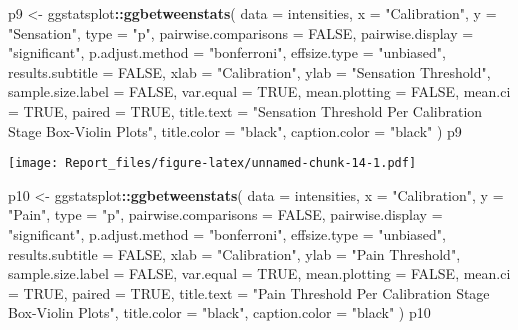 \documentclass[
]{article}
\newenvironment{Shaded}{\begin{snugshade}}{\end{snugshade}}
\newcommand{\DataTypeTok}[1]{\textcolor[rgb]{0.13,0.29,0.53}{#1}}
\newcommand{\KeywordTok}[1]{\textcolor[rgb]{0.13,0.29,0.53}{\textbf{#1}}}
\newcommand{\NormalTok}[1]{#1}
\newcommand{\OperatorTok}[1]{\textcolor[rgb]{0.81,0.36,0.00}{\textbf{#1}}}
\newcommand{\OtherTok}[1]{\textcolor[rgb]{0.56,0.35,0.01}{#1}}
\newcommand{\StringTok}[1]{\textcolor[rgb]{0.31,0.60,0.02}{#1}}
\begin{document}
\begin{Shaded}
\begin{Highlighting}[]
\NormalTok{p9 <-}\StringTok{ }\NormalTok{ggstatsplot}\OperatorTok{::}\KeywordTok{ggbetweenstats}\NormalTok{(}
  \DataTypeTok{data =}\NormalTok{ intensities,}
  \DataTypeTok{x =} \StringTok{"Calibration"}\NormalTok{,}
  \DataTypeTok{y =} \StringTok{"Sensation"}\NormalTok{,}
  \DataTypeTok{type =} \StringTok{"p"}\NormalTok{,}
  \DataTypeTok{pairwise.comparisons =} \OtherTok{FALSE}\NormalTok{,}
  \DataTypeTok{pairwise.display =} \StringTok{"significant"}\NormalTok{,}
  \DataTypeTok{p.adjust.method =} \StringTok{"bonferroni"}\NormalTok{,}
  \DataTypeTok{effsize.type =} \StringTok{"unbiased"}\NormalTok{,}
  \DataTypeTok{results.subtitle =} \OtherTok{FALSE}\NormalTok{,}
  \DataTypeTok{xlab =} \StringTok{"Calibration"}\NormalTok{,}
  \DataTypeTok{ylab =} \StringTok{"Sensation Threshold"}\NormalTok{,}
  \DataTypeTok{sample.size.label =} \OtherTok{FALSE}\NormalTok{,}
  \DataTypeTok{var.equal =} \OtherTok{TRUE}\NormalTok{,}
  \DataTypeTok{mean.plotting =} \OtherTok{FALSE}\NormalTok{,}
  \DataTypeTok{mean.ci =} \OtherTok{TRUE}\NormalTok{,}
  \DataTypeTok{paired =} \OtherTok{TRUE}\NormalTok{,}
  \DataTypeTok{title.text =} \StringTok{"Sensation Threshold Per Calibration Stage Box-Violin Plots"}\NormalTok{,}
  \DataTypeTok{title.color =} \StringTok{"black"}\NormalTok{,}
  \DataTypeTok{caption.color =} \StringTok{"black"}
\NormalTok{  )}
\NormalTok{p9}
\end{Highlighting}
\end{Shaded}

\texttt{[image: Report\_files/figure-latex/unnamed-chunk-14-1.pdf]}

\begin{Shaded}
\begin{Highlighting}[]
\NormalTok{p10 <-}\StringTok{ }\NormalTok{ggstatsplot}\OperatorTok{::}\KeywordTok{ggbetweenstats}\NormalTok{(}
  \DataTypeTok{data =}\NormalTok{ intensities,}
  \DataTypeTok{x =} \StringTok{"Calibration"}\NormalTok{,}
  \DataTypeTok{y =} \StringTok{"Pain"}\NormalTok{,}
  \DataTypeTok{type =} \StringTok{"p"}\NormalTok{,}
  \DataTypeTok{pairwise.comparisons =} \OtherTok{FALSE}\NormalTok{,}
  \DataTypeTok{pairwise.display =} \StringTok{"significant"}\NormalTok{,}
  \DataTypeTok{p.adjust.method =} \StringTok{"bonferroni"}\NormalTok{,}
  \DataTypeTok{effsize.type =} \StringTok{"unbiased"}\NormalTok{,}
  \DataTypeTok{results.subtitle =} \OtherTok{FALSE}\NormalTok{,}
  \DataTypeTok{xlab =} \StringTok{"Calibration"}\NormalTok{,}
  \DataTypeTok{ylab =} \StringTok{"Pain Threshold"}\NormalTok{,}
  \DataTypeTok{sample.size.label =} \OtherTok{FALSE}\NormalTok{,}
  \DataTypeTok{var.equal =} \OtherTok{TRUE}\NormalTok{,}
  \DataTypeTok{mean.plotting =} \OtherTok{FALSE}\NormalTok{,}
  \DataTypeTok{mean.ci =} \OtherTok{TRUE}\NormalTok{,}
  \DataTypeTok{paired =} \OtherTok{TRUE}\NormalTok{,}
  \DataTypeTok{title.text =} \StringTok{"Pain Threshold Per Calibration Stage Box-Violin Plots"}\NormalTok{,}
  \DataTypeTok{title.color =} \StringTok{"black"}\NormalTok{,}
  \DataTypeTok{caption.color =} \StringTok{"black"}
\NormalTok{  )}
\NormalTok{p10}
\end{Highlighting}
\end{Shaded}
\end{document}
